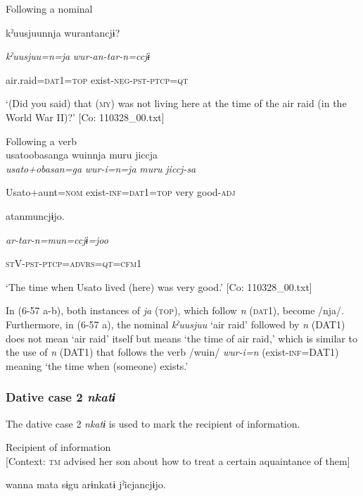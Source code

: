 \ea\label{ex:6-57}
\ea Following a nominal\\
\gll

{\US}
kˀuusjuunnja  wurantancjɨ?

      \textit{kˀuusjuu=n=ja}  \textit{wur-an-tar-n=ccjɨ}

      air.raid=\textsc{dat}1=\textsc{top}  exist-\textsc{neg}-\textsc{pst}-\textsc{ptcp}=\textsc{qt}

\glt ‘(Did you said) that (\textsc{my}) was not living here at the time of the air raid (in the World War II)?’ [Co: 110328\_00.txt]
\z

 \ex Following a verb\\
{\TM}
\gll  usato{\textbar}obasan{\textbar}ga  wuinnja  muru  jiccja\\

      \textit{usato+obasan=ga}  \textit{wur-i=n=ja}  \textit{muru}  \textit{jiccj-sa}

      Usato+aunt=\textsc{nom}  exist-\textsc{inf}=\textsc{dat}1=\textsc{top}  very  good-\textsc{adj}

      atanmuncjɨjo.

      \textit{ar-tar-n=mun=ccjɨ=joo}

      \textsc{st}V-\textsc{pst}-\textsc{ptcp}=\textsc{advrs}=\textsc{qt}=\textsc{cfm}1

\glt ‘The time when Usato lived (here) was very good.’ [Co: 110328\_00.txt]
\z

In (6-57 a-b), both instances of \textit{ja} (\textsc{top}), which follow \textit{n} (\textsc{dat}1), become /nja/. Furthermore, in (6-57 a), the nominal \textit{kˀuusjuu} ‘air raid’ followed by \textit{n} (DAT1) does not mean ‘air raid’ itself but means ‘the time of air raid,’ which is similar to the use of \textit{n} (DAT1) that follows the verb /wuin/ \textit{wur-i=n} (exist-\textsc{inf}=DAT1) meaning ‘the time when (someone) exists.’

\subsubsection{Dative case 2 \textit{nkatɨ}}

The dative case 2 \textit{nkatɨ} is used to mark the recipient of information.

\ea\label{ex:6-58}
 Recipient of information\\{}
[Context: \textsc{tm} advised her son about how to treat a certain aquaintance of them]

{\TM}
\gll wanna  mata  sɨgu  arɨnkatɨ  jˀicjancjɨjo.

